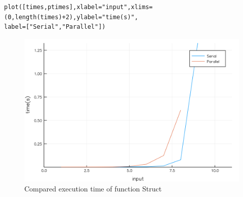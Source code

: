 \documentclass[a4paper,12pt]{article}
\begin{document}
\noindent{}
\begin{Verbatim}[fontsize=\footnotesize]
plot([times,ptimes],xlabel="input",xlims=(0,length(times)+2),ylabel="time(s)",
label=["Serial","Parallel"])
\end{Verbatim}
\begin{figure}[!h]
\centering
\includegraphics[scale=0.08]{StructC.png}
\caption{Compared execution time of function Struct}
\end{figure}
\newpage
\end{document}

